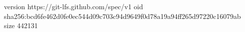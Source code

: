 version https://git-lfs.github.com/spec/v1
oid sha256:bcd6fe462d0fe0ec544d09c703c94d9649f0d78a19a94ff265d97220c16079ab
size 442131
